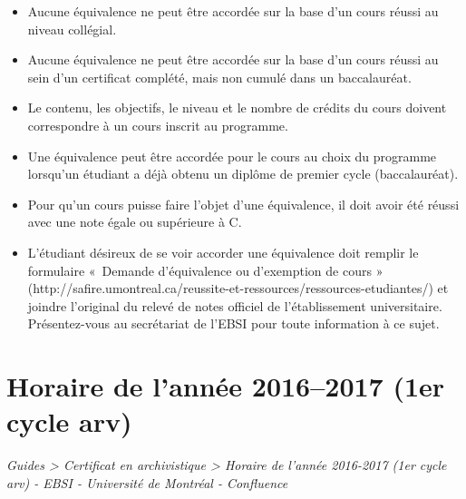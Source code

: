 \documentclass [12 pt]{article}
\begin{document}
        \begin{itemize}
        
                
        \item Aucune équivalence ne peut être accordée sur la base d'un cours réussi au niveau
                    collégial.
                
        \item Aucune équivalence ne peut être accordée sur la base d'un cours réussi au sein
                    d'un certificat complété, mais non cumulé dans un baccalauréat.
                
        \item Le contenu, les objectifs, le niveau et le nombre de crédits du cours doivent
                    correspondre à un cours inscrit au programme.
                
        \item Une équivalence peut être accordée pour le cours au choix du programme lorsqu'un
                    étudiant a déjà obtenu un diplôme de premier cycle (baccalauréat).
                
        \item Pour qu'un cours puisse faire l'objet d'une équivalence, il doit avoir été
                    réussi avec une note égale ou supérieure à C.
                
        \item L'étudiant désireux de se voir accorder une équivalence doit remplir le
                    formulaire « Demande d'équivalence ou d'exemption de cours » (http://safire.umontreal.ca/reussite-et-ressources/ressources-etudiantes/)
                    et joindre l'original du relevé de notes officiel de l'établissement
                    universitaire. Présentez-vous au secrétariat de l'EBSI pour toute information à
                    ce sujet.
            
        \end{itemize}
    
        
    
    
        \newpage
        \section {
        Horaire de l'année 2016–2017 (1er cycle arv)
        }
        
        
        
        \textit{
        Guides > Certificat en archivistique > Horaire de l'année 2016-2017 (1er
            cycle arv) - EBSI - Université de Montréal - Confluence
        }
    
\end{document}
